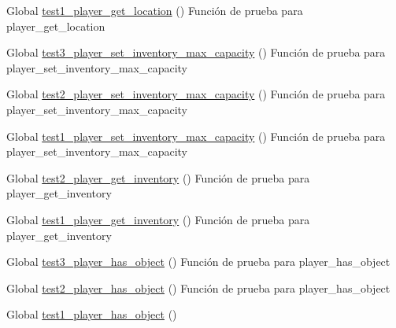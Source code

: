 
\begin{DoxyRefList}
\item[Global \mbox{\hyperlink{player__test_8c_a408a557a0cff748c10fb9a03445af191}{test1\+\_\+player\+\_\+get\+\_\+location}} ()]\label{test__test000196}%
%
Función de prueba para player\+\_\+get\+\_\+location  
\item[Global \mbox{\hyperlink{player__test_8c_ae3447f70a2f6ccb4f501f7630c667a73}{test3\+\_\+player\+\_\+set\+\_\+inventory\+\_\+max\+\_\+capacity}} ()]\label{test__test000205}%
%
Función de prueba para player\+\_\+set\+\_\+inventory\+\_\+max\+\_\+capacity  
\item[Global \mbox{\hyperlink{player__test_8c_a25f52636fb912ac120d40e17f70554fb}{test2\+\_\+player\+\_\+set\+\_\+inventory\+\_\+max\+\_\+capacity}} ()]\label{test__test000204}%
%
Función de prueba para player\+\_\+set\+\_\+inventory\+\_\+max\+\_\+capacity  
\item[Global \mbox{\hyperlink{player__test_8c_aed1d8026a0c56c42a1a9d89b887a5e4d}{test1\+\_\+player\+\_\+set\+\_\+inventory\+\_\+max\+\_\+capacity}} ()]\label{test__test000203}%
%
Función de prueba para player\+\_\+set\+\_\+inventory\+\_\+max\+\_\+capacity  
\item[Global \mbox{\hyperlink{player__test_8c_a8f3a62c708fbed848568841ca8b1cd26}{test2\+\_\+player\+\_\+get\+\_\+inventory}} ()]\label{test__test000202}%
%
Función de prueba para player\+\_\+get\+\_\+inventory  
\item[Global \mbox{\hyperlink{player__test_8c_ad4a86b57bc18593265c205d7b27b9ecb}{test1\+\_\+player\+\_\+get\+\_\+inventory}} ()]\label{test__test000201}%
%
Función de prueba para player\+\_\+get\+\_\+inventory  
\item[Global \mbox{\hyperlink{player__test_8c_a956409720fca92e245d798491200f3d6}{test3\+\_\+player\+\_\+has\+\_\+object}} ()]\label{test__test000200}%
%
Función de prueba para player\+\_\+has\+\_\+object  
\item[Global \mbox{\hyperlink{player__test_8c_ae8953d45d8f555a930dbc8aba101d399}{test2\+\_\+player\+\_\+has\+\_\+object}} ()]\label{test__test000199}%
%
Función de prueba para player\+\_\+has\+\_\+object  
\item[Global \mbox{\hyperlink{player__test_8c_abedc0e75ebffb4e7224f5e5ac0ee3055}{test1\+\_\+player\+\_\+has\+\_\+object}} ()]\label{test__test000198}%

\end{DoxyRefList}
